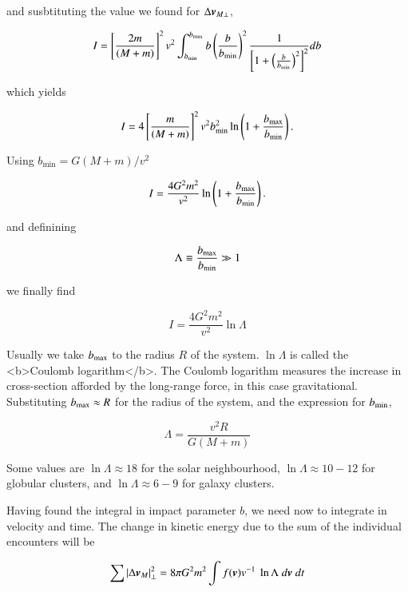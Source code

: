 and susbtituting the value we found for $\Delta {\boldsymbol{v}}_{M\perp}$, 

\begin{equation}
I = \left[\frac{2m}{(M+m)} \right]^2  v^2 \int_{b_{\rm min}}^{b_{\rm max}} b \left(\frac{b}{b_{\rm min}}\right)^2  \frac{1}{\left[1+\left(\frac{b}{b_{\rm min}}\right)^2\right]^2}db   
\end{equation}

which yields

\begin{equation}
I = 4 \left[\frac{m}{(M+m)}\right]^2 v^2 b_{\rm min}^2 \ln \left(1+\frac{b_{\rm max}}{b_{\rm min}}\right).
\end{equation}

Using $b_{\min} = G(M+m)/v^2$


\begin{equation}
I = \frac{4G^2 m^2}{v^2} \ln \left(1+ \frac{b_{\rm max}}{b_{\rm min}}\right).
\end{equation}

and definining

\begin{equation}
\Lambda \equiv \frac{b_{\rm max}}{b_{\rm min}} \gg 1 
\end{equation}

we finally find 

\begin{equation}
\boxed{
I = \frac{4G^2 m^2}{v^2} \ln \Lambda
}
\end{equation}


Usually we take $b_{\rm max}$ to the radius $R$ of the system. $\ln \Lambda$ is called the <b>Coulomb logarithm</b>. The Coulomb logarithm measures the increase in cross-section afforded by the long-range force, in this case gravitational. Substituting $b_{\rm max}\approx R$ for the radius of the system, and the expression for $b_{\rm min}$, 

\begin{equation}
\Lambda = \frac{v^2 R}{G(M+m)}
\end{equation}


Some values are $\ln \Lambda \approx 18$ for the solar neighbourhood, $\ln \Lambda \approx 10-12$ for globular clusters, and $\ln \Lambda \approx 6-9$ for galaxy clusters. 


Having found the integral in impact parameter $b$, we need now to integrate in velocity and time. The change in kinetic energy due to the sum of the individual encounters will be  


\begin{equation}
\sum |\Delta {\boldsymbol{v}}_{M}|_\perp^2  = 8\pi G^2 m^2 \int f({\boldsymbol{v}}) v^{-1} \ \ln \Lambda \ d{\boldsymbol{v}} \ dt
\end{equation}

